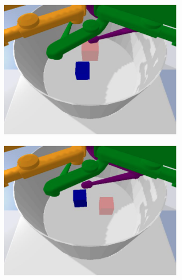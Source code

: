 \begin{figure}[t]
    \centering
    \begin{subfigure}{.3\textwidth}
        \centering
        \includegraphics[width=\linewidth]{figures/obs_1.png}
    \end{subfigure}
    \begin{subfigure}{.3\textwidth}
        \centering
        \includegraphics[width=\linewidth]{figures/obs_2.png}
    \end{subfigure}
    \begin{subfigure}{.3\textwidth}
        \centering

\end{subfigure}
\end{figure}
